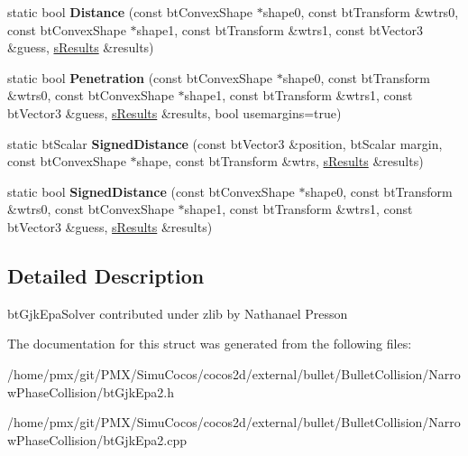\begin{DoxyCompactItemize}
\mbox{\label{structbtGjkEpaSolver2_a0d1f6ba5c0360e190715cb69133f151c}} 
static bool {\bfseries Distance} (const bt\+Convex\+Shape $\ast$shape0, const bt\+Transform \&wtrs0, const bt\+Convex\+Shape $\ast$shape1, const bt\+Transform \&wtrs1, const bt\+Vector3 \&guess, \hyperlink{structbtGjkEpaSolver2_1_1sResults}{s\+Results} \&results)
\item 
\mbox{\label{structbtGjkEpaSolver2_acaa80a6f5f8fa32e00ae0f35ed612c5b}} 
static bool {\bfseries Penetration} (const bt\+Convex\+Shape $\ast$shape0, const bt\+Transform \&wtrs0, const bt\+Convex\+Shape $\ast$shape1, const bt\+Transform \&wtrs1, const bt\+Vector3 \&guess, \hyperlink{structbtGjkEpaSolver2_1_1sResults}{s\+Results} \&results, bool usemargins=true)
\item 
\mbox{\label{structbtGjkEpaSolver2_a0bfbbe5cc7ab7fcf4a2380e82b4c4b12}} 
static bt\+Scalar {\bfseries Signed\+Distance} (const bt\+Vector3 \&position, bt\+Scalar margin, const bt\+Convex\+Shape $\ast$shape, const bt\+Transform \&wtrs, \hyperlink{structbtGjkEpaSolver2_1_1sResults}{s\+Results} \&results)
\item 
\mbox{\label{structbtGjkEpaSolver2_af743d54616335d55c96b48ea2b06d2fe}} 
static bool {\bfseries Signed\+Distance} (const bt\+Convex\+Shape $\ast$shape0, const bt\+Transform \&wtrs0, const bt\+Convex\+Shape $\ast$shape1, const bt\+Transform \&wtrs1, const bt\+Vector3 \&guess, \hyperlink{structbtGjkEpaSolver2_1_1sResults}{s\+Results} \&results)
\end{DoxyCompactItemize}


\subsection{Detailed Description}
bt\+Gjk\+Epa\+Solver contributed under zlib by Nathanael Presson 

The documentation for this struct was generated from the following files\+:\begin{DoxyCompactItemize}
\item 
/home/pmx/git/\+P\+M\+X/\+Simu\+Cocos/cocos2d/external/bullet/\+Bullet\+Collision/\+Narrow\+Phase\+Collision/bt\+Gjk\+Epa2.\+h\item 
/home/pmx/git/\+P\+M\+X/\+Simu\+Cocos/cocos2d/external/bullet/\+Bullet\+Collision/\+Narrow\+Phase\+Collision/bt\+Gjk\+Epa2.\+cpp\end{DoxyCompactItemize}

